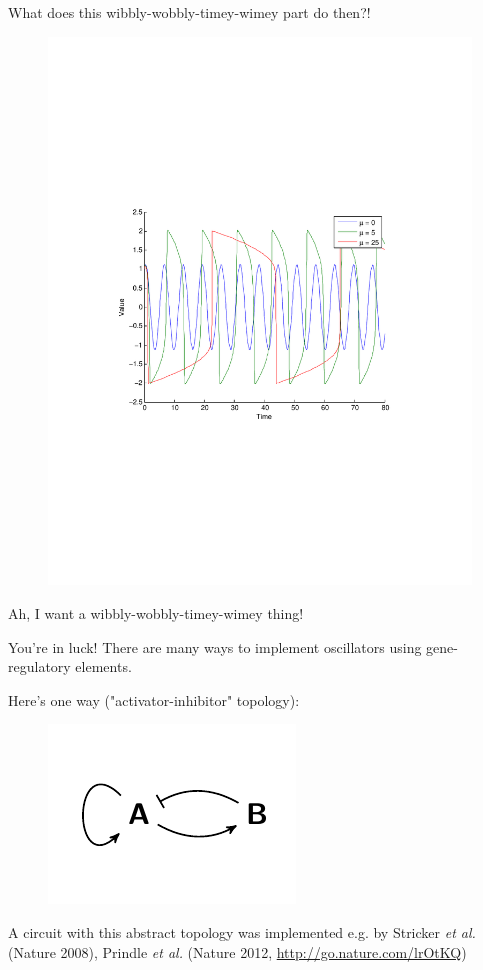 \documentclass[handout]{beamer} %
\newcommand{\br}{\vspace{\baselineskip}}
\begin{document}
\begin{frame}{What does this wibbly-wobbly-timey-wimey part do then?!}
\pause
\begin{figure}[htp]
    \includegraphics[scale=0.60, clip=true, trim=3.5cm 8cm 3.5cm 8cm]{sys2.pdf}
\end{figure}

\end{frame}

\begin{frame}{Ah, I want a wibbly-wobbly-timey-wimey thing!}

You're in luck! There are many ways to implement oscillators using gene-regulatory elements.

\pause
\br
Here's one way ("activator-inhibitor" topology):
\begin{figure}
    \includegraphics[scale=1]{hasty_diagram.pdf}
\end{figure}

\pause A circuit with this abstract topology was implemented e.g. by Stricker \emph{et al.} (Nature 2008), Prindle \emph{et al.} (Nature 2012, \href{http://go.nature.com/lrOtKQ}{http://go.nature.com/lrOtKQ})

\end{frame}
\end{document}
